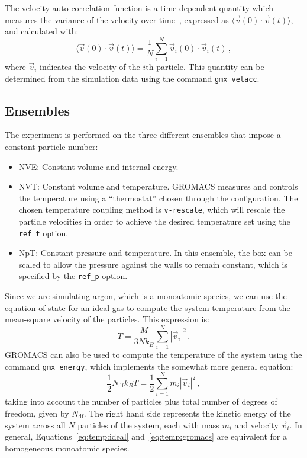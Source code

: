 \documentclass[12pt]{article}
\newcommand{\code}[1]{\lstinline{#1}}
\begin{document}
The velocity auto-correlation function is a time dependent quantity which measures the variance of the velocity over time~\cite{Balakrishnan2020}, expressed as $\langle \vec{v}(0) \cdot \vec{v}(t) \rangle$, and calculated with:
\begin{equation}
	\langle \vec{v}(0) \cdot \vec{v}(t) \rangle = \frac{1}{N} \sum_{i=1}^N \vec{v}_i(0) \cdot \vec{v}_i(t)\,,
\end{equation}
where $\vec{v}_i$ indicates the velocity of the $i$th particle. This quantity can be determined from the simulation data using the command \code{gmx velacc}.



\subsection{Ensembles}

The experiment is performed on the three different ensembles that impose a constant particle number:
\begin{itemize}
	\item NVE: Constant volume and internal energy. 
	\item NVT: Constant volume and temperature. GROMACS measures and controls the temperature using a ``thermostat'' chosen through the configuration. The chosen temperature coupling method is \code{v-rescale}, which will rescale the particle velocities in order to achieve the desired temperature set using the \code{ref_t} option.
	\item NpT: Constant pressure and temperature. In this ensemble, the box can be scaled to allow the pressure against the walls to remain constant, which is specified by the \code{ref_p} option. 
\end{itemize}

Since we are simulating argon, which is a monoatomic species, we can use the equation of state for an ideal gas to compute the system temperature from the mean-square velocity of the particles. This expression is:
\begin{equation}
	T = \frac{M}{3N k_B} \sum_{i=1}^N |\vec{v}_i|^2\,. \label{eq:temp:ideal}
\end{equation} 
GROMACS can also be used to compute the temperature of the system using the command \code{gmx energy}, which implements the somewhat more general equation:
\begin{equation}
	\frac{1}{2}N_{\text{df}}k_B T = \frac{1}{2}\sum_{i=1}^N m_i |\vec{v}_i|^2\,,	\label{eq:temp:gromacs}
\end{equation}
taking into account the number of particles plus total number of degrees of freedom, given by $N_{\text{df}}$. The right hand side represents the kinetic energy of the system across all $N$ particles of the system, each with mass $m_i$ and velocity $\vec{v}_i$. In general, Equations~\ref{eq:temp:ideal} and~\ref{eq:temp:gromacs} are equivalent for a homogeneous monoatomic species.
\end{document}
